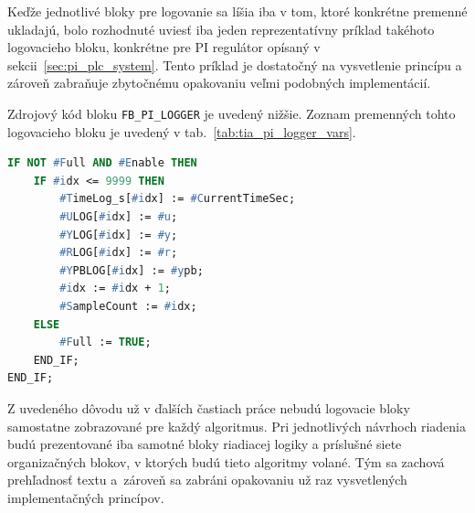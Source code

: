 Keďže jednotlivé bloky pre logovanie sa líšia iba v tom, ktoré konkrétne premenné
ukladajú, bolo rozhodnuté uviesť iba jeden reprezentatívny príklad takéhoto
logovacieho bloku, konkrétne pre PI regulátor opísaný v sekcii~\ref{sec:pi_plc_system}.
Tento príklad je dostatočný na vysvetlenie princípu a zároveň zabraňuje
zbytočnému opakovaniu veľmi podobných implementácií.

Zdrojový kód bloku \texttt{FB\_PI\_LOGGER} je uvedený nižšie. Zoznam premenných tohto logovacieho bloku je uvedený v tab.~\ref{tab:tia_pi_logger_vars}.

\begin{lstlisting}[language=Pascal,
caption={Implementácia logovacieho bloku \texttt{FB\_PI\_LOGGER}},
label={lst:fb_pi_logger}]
IF NOT #Full AND #Enable THEN
    IF #idx <= 9999 THEN
        #TimeLog_s[#idx] := #CurrentTimeSec;
        #ULOG[#idx] := #u;
        #YLOG[#idx] := #y;
        #RLOG[#idx] := #r;
        #YPBLOG[#idx] := #ypb;
        #idx := #idx + 1;
        #SampleCount := #idx;
    ELSE
        #Full := TRUE;
    END_IF;
END_IF;
\end{lstlisting}




Z uvedeného dôvodu už v ďalších častiach práce nebudú logovacie bloky
samostatne zobrazované pre každý algoritmus. Pri jednotlivých návrhoch riadenia
budú prezentované iba samotné bloky riadiacej logiky a príslušné siete
organizačných blokov, v ktorých budú tieto algoritmy volané. Tým sa zachová
prehľadnosť textu a~zároveň sa zabráni opakovaniu už raz vysvetlených
implementačných princípov.

